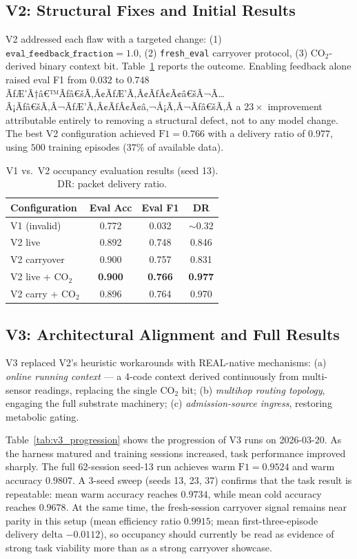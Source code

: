 \documentclass[10pt,twocolumn]{article}
\begin{document}
\subsection{V2: Structural Fixes and Initial Results}

V2 addressed each flaw with a targeted change:
(1) $\texttt{eval\_feedback\_fraction} = 1.0$,
(2) \texttt{fresh\_eval} carryover protocol,
(3) CO$_2$-derived binary context bit.
Table~\ref{tab:v2_results} reports the outcome.
Enabling feedback alone raised eval F1 from $0.032$ to $0.748$ ÃƒÆ’Ã†â€™Ãƒâ€šÃ‚Â¢ÃƒÆ’Ã‚Â¢ÃƒÂ¢Ã¢â€šÂ¬Ã…Â¡Ãƒâ€šÃ‚Â¬ÃƒÆ’Ã‚Â¢ÃƒÂ¢Ã¢â‚¬Å¡Ã‚Â¬Ãƒâ€šÃ‚Â a $23\times$
improvement attributable entirely to removing a structural defect, not to
any model change.
The best V2 configuration achieved $\mathrm{F1} = 0.766$ with a delivery
ratio of $0.977$, using $500$ training episodes ($37\%$ of available data).

\begin{table}[t]
\centering
\caption{V1 vs.\ V2 occupancy evaluation results (seed 13).
  DR: packet delivery ratio.}
\label{tab:v2_results}
\small
\begin{tabular}{lccc}
\toprule
Configuration & Eval Acc & Eval F1 & DR \\
\midrule
V1 (invalid)          & 0.772 & 0.032 & $\sim$0.32 \\
V2 live               & 0.892 & 0.748 & 0.846 \\
V2 carryover          & 0.900 & 0.757 & 0.831 \\
V2 live + CO$_2$      & \textbf{0.900} & \textbf{0.766} & \textbf{0.977} \\
V2 carry + CO$_2$     & 0.896 & 0.764 & 0.970 \\
\bottomrule
\end{tabular}
\end{table}

\subsection{V3: Architectural Alignment and Full Results}

V3 replaced V2's heuristic workarounds with REAL-native mechanisms:
(a) \emph{online running context} --- a 4-code context derived continuously
from multi-sensor readings, replacing the single CO$_2$ bit;
(b) \emph{multihop routing topology}, engaging the full substrate machinery;
(c) \emph{admission-source ingress}, restoring metabolic gating.

Table~\ref{tab:v3_progression} shows the progression of V3 runs on 2026-03-20.
As the harness matured and training sessions increased, task performance
improved sharply.
The full 62-session seed-13 run achieves warm $\mathrm{F1} = 0.9524$ and warm
accuracy $0.9807$.
A 3-seed sweep (seeds 13, 23, 37) confirms that the task result is repeatable:
mean warm accuracy reaches $0.9734$, while mean cold accuracy reaches $0.9678$.
At the same time, the fresh-session carryover signal remains near parity in
this setup (mean efficiency ratio $0.9915$; mean first-three-episode delivery
delta $-0.0112$), so occupancy should currently be read as evidence of strong
task viability more than as a strong carryover showcase.
\end{document}
